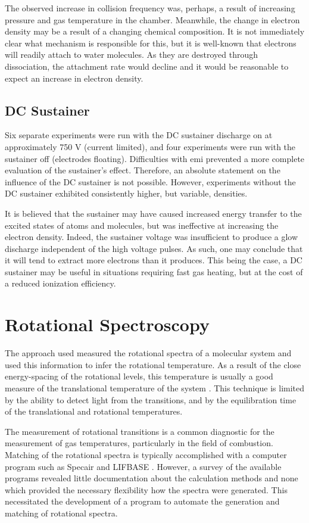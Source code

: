 The observed increase in collision frequency was, perhaps, a result of
increasing pressure and gas temperature in the chamber. Meanwhile, the change in
electron density may be a result of a changing chemical composition. It is not
immediately clear what mechanism is responsible for this, but it is well-known
that electrons will readily attach to water molecules. As they are destroyed
through dissociation, the attachment rate would decline and it would be
reasonable to expect an increase in electron density.

\subsection{DC Sustainer}

Six separate experiments were run with the DC sustainer discharge on at
approximately 750 V (current limited), and four experiments were run with the
sustainer off (electrodes floating). Difficulties with \acs{emi} prevented a
more complete evaluation of the sustainer's effect. Therefore, an absolute
statement on the influence of the DC sustainer is not possible. However,
experiments without the DC sustainer exhibited consistently higher, but
variable, densities.

It is believed that the sustainer may have caused increased energy transfer to
the excited states of atoms and molecules, but was ineffective at increasing the
electron density. Indeed, the sustainer voltage was insufficient to produce a
glow discharge independent of the high voltage pulses. As such, one may conclude
that it will tend to extract more electrons than it produces. This being the
case, a DC sustainer may be useful in situations requiring fast gas heating, but
at the cost of a reduced ionization efficiency.

\section{Rotational Spectroscopy}

The approach used measured the rotational spectra of
a molecular system and used this information to infer the rotational
temperature. As a result of the close energy-spacing of the rotational levels,
this temperature is usually a good measure of the translational temperature of
the system \cite{Laux1993}. This technique is limited by the ability to detect
light from the transitions, and by the equilibration time of the translational
and rotational temperatures.

The measurement of rotational transitions is a common diagnostic for the
measurement of gas temperatures, particularly in the field of combustion.
Matching of the rotational spectra is typically accomplished with a computer
program such as Specair \cite{Laux2002} and LIFBASE \cite{Luque1999}. However, a
survey of the available programs revealed little documentation about the
calculation methods and none which provided the necessary flexibility how the
spectra were generated. This necessitated the development of a program to
automate the generation and matching of rotational spectra.
